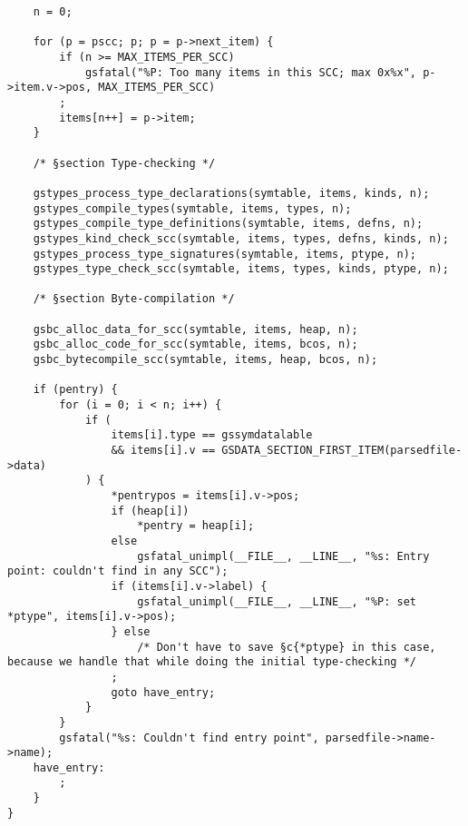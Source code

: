 \documentclass{report}
\begin{document}
\begin{verbatim}
    n = 0;

    for (p = pscc; p; p = p->next_item) {
        if (n >= MAX_ITEMS_PER_SCC)
            gsfatal("%P: Too many items in this SCC; max 0x%x", p->item.v->pos, MAX_ITEMS_PER_SCC)
        ;
        items[n++] = p->item;
    }

    /* §section Type-checking */

    gstypes_process_type_declarations(symtable, items, kinds, n);
    gstypes_compile_types(symtable, items, types, n);
    gstypes_compile_type_definitions(symtable, items, defns, n);
    gstypes_kind_check_scc(symtable, items, types, defns, kinds, n);
    gstypes_process_type_signatures(symtable, items, ptype, n);
    gstypes_type_check_scc(symtable, items, types, kinds, ptype, n);

    /* §section Byte-compilation */

    gsbc_alloc_data_for_scc(symtable, items, heap, n);
    gsbc_alloc_code_for_scc(symtable, items, bcos, n);
    gsbc_bytecompile_scc(symtable, items, heap, bcos, n);

    if (pentry) {
        for (i = 0; i < n; i++) {
            if (
                items[i].type == gssymdatalable
                && items[i].v == GSDATA_SECTION_FIRST_ITEM(parsedfile->data)
            ) {
                *pentrypos = items[i].v->pos;
                if (heap[i])
                    *pentry = heap[i];
                else
                    gsfatal_unimpl(__FILE__, __LINE__, "%s: Entry point: couldn't find in any SCC");
                if (items[i].v->label) {
                    gsfatal_unimpl(__FILE__, __LINE__, "%P: set *ptype", items[i].v->pos);
                } else
                    /* Don't have to save §c{*ptype} in this case, because we handle that while doing the initial type-checking */
                ;
                goto have_entry;
            }
        }
        gsfatal("%s: Couldn't find entry point", parsedfile->name->name);
    have_entry:
        ;
    }
}
\end{verbatim}
\end{document}
